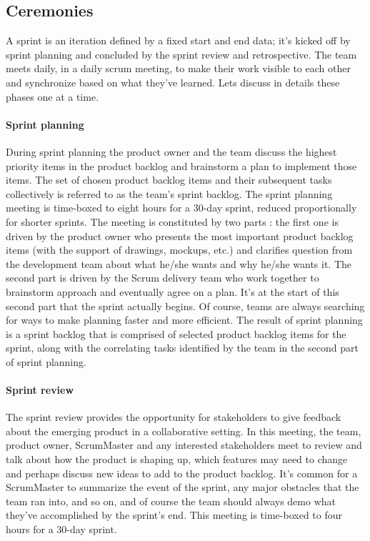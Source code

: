 \documentclass[11pt]{article}
\begin{document}
\subsection{Ceremonies}
A sprint is an iteration defined by a fixed start and end data; it's kicked off by sprint planning and concluded by the sprint review and retrospective. The team meets daily, in a daily scrum meeting, to make their work visible to each other and synchronize based on what they've learned. Lets discuss in details these phases one at a time.
\paragraph{Sprint planning} During sprint planning the product owner and the team discuss the highest priority items in the product backlog and brainstorm a plan to implement those items. The set of chosen product backlog items and their subsequent tasks collectively is referred to as the team's sprint backlog. The sprint planning meeting is time-boxed to eight hours for a 30-day sprint, reduced proportionally for shorter sprints. The meeting is constituted by two parts : the first one is driven by the product owner who presents the most important product backlog items (with the support of drawings, mockups, etc.) and clarifies question from the development team about what he/she wants and why he/she wants it. The second part is driven by the Scrum delivery team who work together to brainstorm approach and eventually agree on a plan. It's at the start of this second part that the sprint actually begins. Of course, teams are always searching for ways to make planning faster and more efficient. The result of sprint planning is a sprint backlog that is comprised of selected product backlog items for the sprint, along with the correlating tasks identified by the team in the second part of sprint planning.
\paragraph{Sprint review} The sprint review provides the opportunity for stakeholders to give feedback about the emerging product in a collaborative setting. In this meeting, the team, product owner, ScrumMaster and any interested stakeholders meet to review and talk about how the product is shaping up, which features may need to change and perhaps discuss new ideas to add to the product backlog. It's common for a ScrumMaster to summarize the event of the sprint, any major obstacles that the team ran into, and so on, and of course the team should always demo what they've accomplished by the sprint's end. This meeting is time-boxed to four hours for a 30-day sprint.
\end{document}

